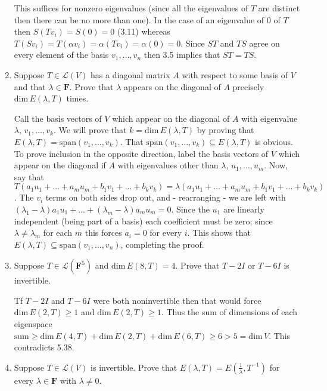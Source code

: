 \documentclass{book}
\begin{document}
\begin{enumerate}
This suffices for nonzero eigenvalues (since all the eigenvalues of \(T\) are distinct then there can be no more than one).  In the case of an eigenvalue of \(0\) of \(T\) then \(S(Tv_i)=S(0)=0\) (3.11) whereas \(T(Sv_i)=T(\alpha v_i)=\alpha(Tv_i)=\alpha(0)=0\).  Since \(ST\) and \(TS\) agree on every element of the basis \(v_1,\dots,v_n\) then 3.5 implies that \(ST=TS\).

\item Suppose \(T \in \mathcal{L}(V)\) has a diagonal matrix \(A\) with respect to some basis of \(V\) and that \(\lambda \in \textbf{F}\).  Prove that \(\lambda\) appears on the diagonal of \(A\) precisely \(\textrm{dim} \, E(\lambda,T)\) times.

Call the basis vectors of \(V\) which appear on the diagonal of \(A\) with eigenvalue \(\lambda\), \(v_1,\dots,v_k\).  We will prove that \(k=\text{dim} \, E(\lambda,T)\) by proving that \(E(\lambda,T)=\text{span}(v_1,\dots,v_k)\).  That \(\text{span}(v_1,\dots,v_k) \subseteq E(\lambda,T)\) is obvious.  To prove inclusion in the opposite direction, label the basis vectors of \(V\) which appear on the diagonal if \(A\) with eigenvalues other than \(\lambda\), \(u_1,\dots,u_m\).  Now, say that \(T(a_1u_1+\dots+a_mu_m+b_1v_1+\dots+b_kv_k)=\lambda(a_1u_1+\dots+a_mu_m+b_1v_1+\dots+b_kv_k)\).  The \(v_i\) terms on both sides drop out, and - rearranging - we are left with \((\lambda_1-\lambda)a_1u_1+\dots+(\lambda_m-\lambda)a_mu_m=0\).  Since the \(u_1\) are linearly independent (being part of a basis) each coefficient must be zero; since \(\lambda \neq \lambda_m\) for each \(m\) this forces \(a_i=0\) for every \(i\).  This shows that \(E(\lambda,T) \subseteq \text{span}(v_1,\dots,v_n)\), completing the proof.

\item Suppose \(T \in \mathcal{L}(\textbf{F}^5)\) and \(\textrm{dim} \, E(8,T)=4\).  Prove that \(T-2I\) or \(T-6I\) is invertible.

Tf \(T-2I\) and \(T-6I\) were both noninvertible then that would force \(\text{dim} \, E(2,T) \geq 1\) and \(\text{dim} \, E(2,T) \geq 1\).  Thus the sum of dimensions of each eigenspace \(\text{sum} \geq \text{dim} \, E(4,T) + \text{dim} \, E(2,T) + \text{dim} \, E(6,T) \geq 6 > 5 = \text{dim} \, V\).  This contradicts 5.38.

\item Suppose \(T \in \mathcal{L}(V)\) is invertible.  Prove that \(E(\lambda,T)=E(\frac{1}{\lambda},T^{-1})\) for every \(\lambda \in \textbf{F}\) with \(\lambda \neq 0\).


\end{enumerate}
\end{document}
